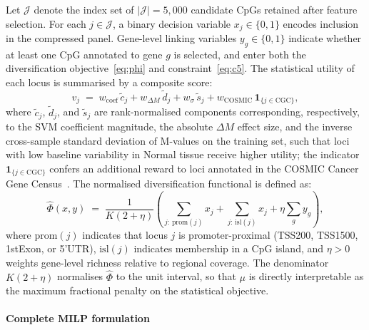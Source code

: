 Let $\mathcal{J}$ denote the index set of $|\mathcal{J}| = 5{,}000$ candidate
CpGs retained after feature selection. For each $j \in \mathcal{J}$, a binary
decision variable $x_j \in \{0,1\}$ encodes inclusion in the compressed panel.
Gene-level linking variables $y_g \in \{0,1\}$ indicate whether at least one
CpG annotated to gene $g$ is selected, and enter both the diversification
objective~\eqref{eq:phi} and constraint~\eqref{eq:c5}.
The statistical utility of each locus is summarised by a composite score:
\begin{equation}
\label{eq:score}
  v_j \;=\;
  w_{\mathrm{coef}}\,\tilde{c}_j
  + w_{\Delta M}\,\tilde{d}_j
  + w_{\sigma}\,\tilde{s}_j
  + w_{\mathrm{COSMIC}}\,\mathbf{1}_{\{j \in \mathrm{CGC}\}},
\end{equation}
where $\tilde{c}_j$, $\tilde{d}_j$, and $\tilde{s}_j$ are rank-normalised
components corresponding, respectively, to the SVM coefficient magnitude,
the absolute $\Delta M$ effect size, and the inverse cross-sample standard deviation of M-values on the training set,
such that loci with low baseline variability in Normal tissue receive higher utility; the indicator $\mathbf{1}_{\{j \in \mathrm{CGC}\}}$
confers an additional reward to loci annotated in the COSMIC Cancer Gene
Census~\cite{sondka2018cosmic}.
The normalised diversification functional is defined as:
\begin{equation}
\label{eq:phi}
\hat{\Phi}(x,y) \;=\;
\frac{1}{K(2+\eta)}\left(
\sum_{j:\,\mathrm{prom}(j)} x_j
+ \sum_{j:\,\mathrm{isl}(j)} x_j
+ \eta \sum_{g} y_g
\right),
\end{equation}
where $\mathrm{prom}(j)$ indicates that locus $j$ is promoter-proximal
(TSS200, TSS1500, 1stExon, or 5'UTR), $\mathrm{isl}(j)$ indicates membership
in a CpG island, and $\eta > 0$ weights gene-level richness relative to regional
coverage. The denominator $K(2+\eta)$ normalises $\hat{\Phi}$ to the unit
interval, so that $\mu$ is directly interpretable as the maximum fractional
penalty on the statistical objective.

\paragraph{Complete MILP formulation}

